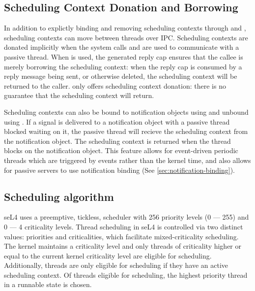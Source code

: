 \subsection{Scheduling Context Donation and Borrowing}

In addition to explictly binding and removing scheduling contexts through  and , scheduling contexts can move between threads over IPC.
Scheduling contexts are donated implicitly when the system calls  and  are used to communicate with a passive thread.
When  is used, the generated reply cap ensures that the callee is merely borrowing the scheduling context: when the reply cap is consumed by a reply message being sent, or otherwise deleted, the scheduling context will be returned to the caller.
 only offers scheduling context donation: there is no guarantee that the scheduling context will return.

Scheduling contexts can also be bound to notification objects using  and unbound using .
If a signal is delivered to a notification object with a passive thread blocked waiting on it, the passive thread will recieve the scheduling context from the notification object.
The scheduling context is returned when the thread blocks on the notification object. 
This feature allows for event-driven periodic threads which are triggered by events rather than the kernel time, and also allows for passive servers to use notification binding (See \autoref{sec:notification-binding}).

\subsection{Scheduling algorithm}
\label{sec:sched}

seL4 uses a preemptive, tickless, scheduler with 256 priority levels (0 --- 255) and 0 --- 4 criticality levels.
Thread scheduling in seL4 is controlled via two distinct values: priorities and criticalities, which facilitate mixed-criticality scheduling.
The kernel maintains a criticality level and only threads of criticality higher or equal to the current kernel criticality level are eligible for scheduling.
Additionally, threads are only eligible for scheduling if they have an active scheduling context.
Of threads eligible for scheduling, the highest priority thread in a runnable state is chosen.

